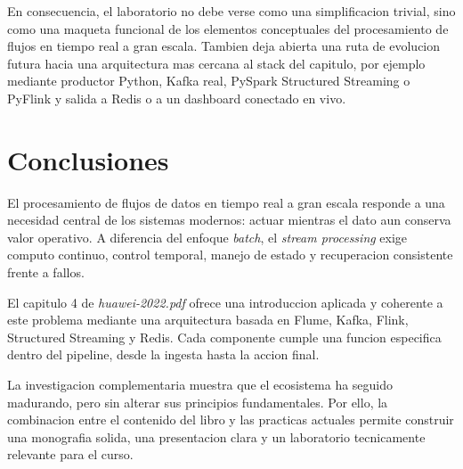 \documentclass[12pt,a4paper]{article}
\begin{document}
En consecuencia, el laboratorio no debe verse como una simplificacion trivial, sino como una maqueta funcional de los elementos conceptuales del procesamiento de flujos en tiempo real a gran escala. Tambien deja abierta una ruta de evolucion futura hacia una arquitectura mas cercana al stack del capitulo, por ejemplo mediante productor Python, Kafka real, PySpark Structured Streaming o PyFlink y salida a Redis o a un dashboard conectado en vivo.

\section{Conclusiones}

El procesamiento de flujos de datos en tiempo real a gran escala responde a una necesidad central de los sistemas modernos: actuar mientras el dato aun conserva valor operativo. A diferencia del enfoque \textit{batch}, el \textit{stream processing} exige computo continuo, control temporal, manejo de estado y recuperacion consistente frente a fallos.

El capitulo 4 de \textit{huawei-2022.pdf} ofrece una introduccion aplicada y coherente a este problema mediante una arquitectura basada en Flume, Kafka, Flink, Structured Streaming y Redis. Cada componente cumple una funcion especifica dentro del pipeline, desde la ingesta hasta la accion final.

La investigacion complementaria muestra que el ecosistema ha seguido madurando, pero sin alterar sus principios fundamentales. Por ello, la combinacion entre el contenido del libro y las practicas actuales permite construir una monografia solida, una presentacion clara y un laboratorio tecnicamente relevante para el curso.

\newpage
\end{document}

